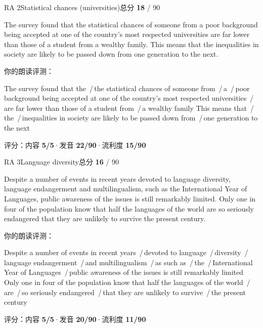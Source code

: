 \documentclass[11pt]{article}
\newcommand{\sfull}[1]{\textcolor{cFix}{\bfseries #1}}     %
\newcommand{\spart}[1]{\textcolor{cPartial}{\bfseries #1}} %
\newcommand{\szero}[1]{\textcolor{cWrong}{\bfseries #1}}   %
\newcommand{\sg}[1]{\textcolor{cSpkGood}{#1}}   %
\newcommand{\sy}[1]{\textcolor{cSpkOk}{#1}}     %
\newcommand{\sr}[1]{\textcolor{cSpkBad}{#1}}    %
\newcommand{\pse}{{\color{gray}\,/\,}}          %
\begin{document}
\begin{qblock}{RA 2\quad Statistical chances (universities)}{总分 \textcolor{cAccent}{\bfseries 18} / 90}
\begin{promptbox}
The survey found that the statistical chances of someone from a poor background being accepted at one of the country's most respected universities are far lower than those of a student from a wealthy family. This means that the inequalities in society are likely to be passed down from one generation to the next.
\end{promptbox}
\smallskip\par{\footnotesize\color{gray}你的朗读评测：}
\begin{asrbox}
\sg{The survey found that the} \pse \sg{the} \sr{statistical chances} \sg{of someone from} \pse \sy{a} \pse \sy{poor} \sg{background being} \sy{accepted at} \sg{one of the country's most respected universities} \pse \sy{are far} \sg{lower than those of} \sg{a student from} \pse \sg{a wealthy family This means that} \pse \sy{the} \pse \sy{inequalities in society} \sg{are likely to be passed down from} \pse \sg{one generation to the next}
\end{asrbox}
{\small 评分：内容 \sfull{5/5}\quad·\quad 发音 \spart{22/90}\quad·\quad 流利度 \szero{15/90}}
\end{qblock}

\begin{qblock}{RA 3\quad Language diversity}{总分 \textcolor{cAccent}{\bfseries 16} / 90}
\begin{promptbox}
Despite a number of events in recent years devoted to language diversity, language endangerment and multilingualism, such as the International Year of Languages, public awareness of the issues is still remarkably limited. Only one in four of the population know that half the languages of the world are so seriously endangered that they are unlikely to survive the present century.
\end{promptbox}
\smallskip\par{\footnotesize\color{gray}你的朗读评测：}
\begin{asrbox}
\sy{Despite a number of events in recent years} \pse \sg{devoted to language} \pse \sy{diversity} \pse \sg{language endangerment} \pse \sy{and multilingualism} \pse \sy{as such as} \pse \sy{the} \pse \sy{International Year of Languages} \pse \sg{public awareness of the issues is still remarkably limited} \sg{Only one in four of the} \sr{population} \sg{know that half the languages of the world} \pse \sy{are} \pse \sy{so seriously endangered} \pse \sg{that they are unlikely to survive} \pse \sy{the present century}
\end{asrbox}
{\small 评分：内容 \sfull{5/5}\quad·\quad 发音 \spart{20/90}\quad·\quad 流利度 \szero{11/90}}
\end{qblock}
\end{document}
